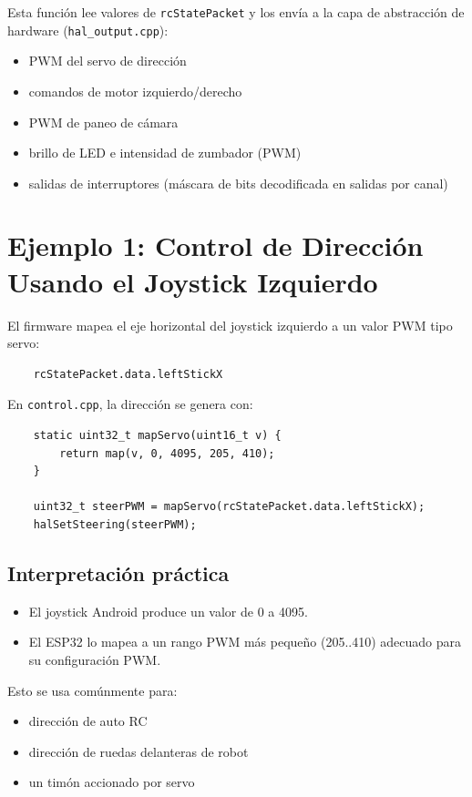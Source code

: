Esta función lee valores de \texttt{rcStatePacket} y los envía a la capa de abstracción de hardware
(\texttt{hal\_output.cpp}):

\begin{itemize}
    \item PWM del servo de dirección
    \item comandos de motor izquierdo/derecho
    \item PWM de paneo de cámara
    \item brillo de LED e intensidad de zumbador (PWM)
    \item salidas de interruptores (máscara de bits decodificada en salidas por canal)
\end{itemize}

\section{Ejemplo 1: Control de Dirección Usando el Joystick Izquierdo}
\label{sec:example-steering}

El firmware mapea el eje horizontal del joystick izquierdo a un valor PWM tipo servo:

\begin{verbatim}
    rcStatePacket.data.leftStickX
\end{verbatim}

En \texttt{control.cpp}, la dirección se genera con:

\begin{verbatim}
    static uint32_t mapServo(uint16_t v) {
        return map(v, 0, 4095, 205, 410);
    }

    uint32_t steerPWM = mapServo(rcStatePacket.data.leftStickX);
    halSetSteering(steerPWM);
\end{verbatim}

\subsection*{Interpretación práctica}
\begin{itemize}
    \item El joystick Android produce un valor de 0 a 4095.
    \item El ESP32 lo mapea a un rango PWM más pequeño (205..410) adecuado para su configuración PWM.
\end{itemize}

\noindent Esto se usa comúnmente para:
\begin{itemize}
    \item dirección de auto RC
    \item dirección de ruedas delanteras de robot
    \item un timón accionado por servo
\end{itemize}

